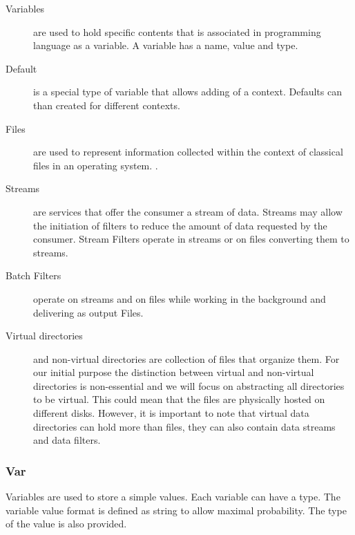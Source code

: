 \documentclass[10pt]{article}
\begin{document}
\begin{description}
\item[Variables] are used to hold specific contents that is associated
  in programming language as a variable. A variable has a name, value
  and type.

\item[Default] is a special type of variable that allows adding of a
  context. Defaults can than created for different contexts.

\item[Files] are used to represent information collected within the
  context of classical files in an operating system. .

\item[Streams] are services that offer the consumer a stream of
  data. Streams may allow the initiation of filters to reduce the
  amount of data requested by the consumer.  Stream Filters operate in
  streams or on files converting them to streams.

\item[Batch Filters] operate on streams and on files while working in
  the background and delivering as output Files. 

\item[Virtual directories] and non-virtual directories are collection
  of files that organize them. For our initial purpose the distinction
  between virtual and non-virtual directories is non-essential and we
  will focus on abstracting all directories to be virtual. This could
  mean that the files are physically hosted on different
  disks. However, it is important to note that virtual data
  directories can hold more than files, they can also contain data
  streams and data filters. 

\end{description}

\subsubsection{Var}

Variables are used to store a simple values. Each variable can have a
type. The variable value format is defined as string to allow maximal
probability. The type of the value is also provided.
\end{document}
